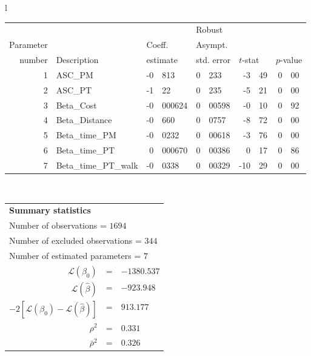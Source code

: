   \begin{tabular}{l}
\begin{tabular}{rlr@{.}lr@{.}lr@{.}lr@{.}l}
         &                       &   \multicolumn{2}{l}{}    & \multicolumn{2}{l}{Robust}  &     \multicolumn{4}{l}{}   \\
Parameter &                       &   \multicolumn{2}{l}{Coeff.}      & \multicolumn{2}{l}{Asympt.}  &     \multicolumn{4}{l}{}   \\
number &  Description                     &   \multicolumn{2}{l}{estimate}      & \multicolumn{2}{l}{std. error}  &   \multicolumn{2}{l}{$t$-stat}  &   \multicolumn{2}{l}{$p$-value}   \\

\hline

1 & ASC_PM  & -0&813 & 0&233 & -3&49 & 0&00\\
2 & ASC_PT & -1&22 & 0&235 & -5&21 & 0&00\\
3 & Beta_Cost & -0&000624 & 0&00598 & -0&10 & 0&92\\
4 & Beta_Distance & -0&660 & 0&0757 & -8&72 & 0&00\\
5 & Beta_time_PM & -0&0232 & 0&00618 & -3&76 & 0&00\\
6 & Beta_time_PT & 0&000670 & 0&00386 & 0&17 & 0&86\\
7 & Beta_time_PT_walk & -0&0338 & 0&00329 & -10&29 & 0&00\\
\hline
\end{tabular}
\\
\begin{tabular}{rcl}
\multicolumn{3}{l}{\bf Summary statistics}\\
\multicolumn{3}{l}{ Number of observations = $1694$} \\
\multicolumn{3}{l}{ Number of excluded observations = $344$} \\
\multicolumn{3}{l}{ Number of estimated  parameters = $7$} \\
 $\mathcal{L}(\beta_0)$ &=&  $-1380.537$ \\
 $\mathcal{L}(\hat{\beta})$ &=& $-923.948 $  \\
 $-2[\mathcal{L}(\beta_0) -\mathcal{L}(\hat{\beta})]$ &=& $913.177$ \\
    $\rho^2$ &=&   $0.331$ \\
    $\bar{\rho}^2$ &=&    $0.326$ \\
\end{tabular}
  \end{tabular}
